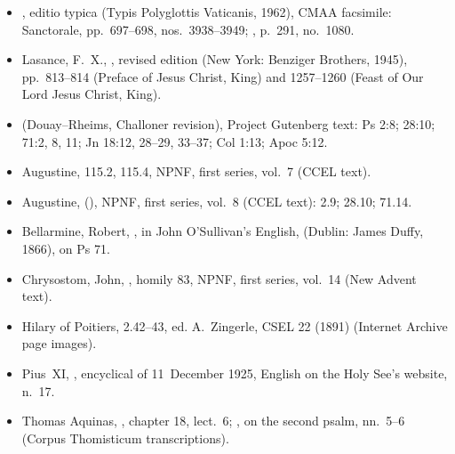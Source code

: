 {\footnotesize
\begin{itemize}\setlength{\itemsep}{0.15em}\setlength{\parskip}{0pt}
\item {}, editio typica (Typis Polyglottis Vaticanis, 1962), CMAA facsimile: Sanctorale, pp.~697--698, nos.~3938--3949; , p.~291, no.~1080.
\item Lasance, F.~X., , revised edition (New York: Benziger Brothers, 1945), pp.~813--814 (Preface of Jesus Christ, King) and 1257--1260 (Feast of Our Lord Jesus Christ, King).
\item {} (Douay--Rheims, Challoner revision), Project Gutenberg text: Ps 2:8; 28:10; 71:2, 8, 11; Jn 18:12, 28--29, 33--37; Col 1:13; Apoc 5:12.
\item Augustine,  115.2, 115.4, NPNF, first series, vol.~7 (CCEL text).
\item Augustine,  (), NPNF, first series, vol.~8 (CCEL text): 2.9; 28.10; 71.14.
\item Bellarmine, Robert, , in John O'Sullivan's English,  (Dublin: James Duffy, 1866), on Ps 71.
\item Chrysostom, John, , homily 83, NPNF, first series, vol.~14 (New Advent text).
\item Hilary of Poitiers,  2.42--43, ed. A.~Zingerle, CSEL 22 (1891) (Internet Archive page images).
\item Pius~XI, , encyclical of 11~December 1925, English on the Holy See's website, n.~17.
\item Thomas Aquinas, , chapter 18, lect.~6; , on the second psalm, nn.~5--6 (Corpus Thomisticum transcriptions).
\end{itemize}
\par}

